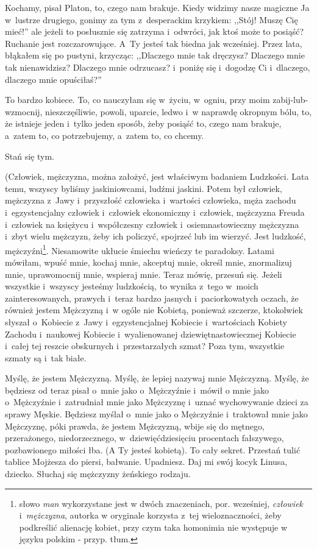\documentclass[oneside,polish,12pt,sfheadings]{mwbk}
\begin{document}
Kochamy, pisał Platon, to, czego nam brakuje. Kiedy widzimy nasze
magiczne Ja w~lustrze drugiego, gonimy za tym z~desperackim krzykiem:
,,Stój! Muszę Cię mieć!'' ale jeżeli to posłusznie się zatrzyma i~odwróci, jak ktoś może to posiąść? Ruchanie jest rozczarowujące. A~Ty jesteś tak biedna jak wcześniej. Przez lata, błąkałem się po pustyni,
krzycząc: ,,Dlaczego mnie tak dręczysz? Dlaczego mnie tak nienawidzisz?
Dlaczego mnie odrzucasz? i~poniżę się i~dogodzę Ci i~dlaczego, dlaczego
mnie opuściłaś?''

To bardzo kobiece. To, co nauczyłam się w~życiu, w~ogniu, przy moim
zabij-lub-wzmocnij, nieszczęśliwie, powoli, uparcie, ledwo i~w naprawdę
okropnym bólu, to, że istnieje jeden i~tylko jeden sposób, żeby
posiąść to, czego nam brakuje, a~zatem to, co potrzebujemy, a~zatem
to, co chcemy.

Stań się tym.

(Człowiek, mężczyzna, można założyć, jest właściwym badaniem Ludzkości.
Lata temu, wszyscy byliśmy jaskiniowcami, ludźmi jaskini. Potem był
człowiek, mężczyzna z~Jawy i~przyszłość człowieka i~wartości człowieka,
męża zachodu i~egzystencjalny człowiek i~człowiek ekonomiczny i~człowiek,
mężczyzna Freuda i~człowiek na księżycu i~współczesny człowiek i~osiemnastowieczny
mężczyzna i~zbyt wielu mężczyzn, żeby ich policzyć, spojrzeć lub im
wierzyć. Jest ludzkość, mężczyźni\footnote{słowo \textit{man} wykorzystane jest w dwóch znaczeniach, por. wcześniej, \textit{człowiek} i~\textit{mężczyzna}, autorka w oryginale korzysta z~tej wieloznaczności, żeby podkreślić
alienację kobiet, przy czym taka homonimia nie występuje w języku polskim - przyp. tłum.}. Niesamowite ukłucie śmiechu wieńczy te paradoksy.
Latami mówiłam, wpuść mnie, kochaj mnie, akceptuj mnie, określ mnie,
znormalizuj mnie, uprawomocnij mnie, wspieraj mnie. Teraz mówię, przesuń
się. Jeżeli wszystkie i~wszyscy jesteśmy ludzkością, to wynika z~tego
w~moich zainteresowanych, prawych i~teraz bardzo jasnych i~paciorkowatych
oczach, że również jestem Mężczyzną i~w ogóle nie Kobietą, ponieważ
szczerze, ktokolwiek słyszał o~Kobiecie z~Jawy i~egzystencjalnej Kobiecie
i~wartościach Kobiety Zachodu i~naukowej Kobiecie i~wyalienowanej
dziewiętnastowiecznej Kobiecie i~całej tej reszcie obskurnych i~przestarzałych
szmat? Poza tym, wszystkie szmaty są i~tak białe.

Myślę, że jestem Mężczyzną. Myślę, że lepiej nazywaj mnie Mężczyzną.
Myślę, że będziesz od teraz pisał o~mnie jako o~Mężczyźnie i~mówił
o mnie jako o~Mężczyźnie i~zatrudniał mnie jako Mężczyznę i~uznać
wychowywanie dzieci za sprawy Męskie. Będziesz myślał o~mnie jako
o Mężczyźnie i~traktował mnie jako Mężczyznę, póki prawda, że jestem
Mężczyzną, wbije się do mętnego, przerażonego, niedorzecznego, w~dziewięćdziesięciu procentach fałszywego, pozbawionego miłości łba. (A Ty jesteś kobietą).
To cały sekret. Przestań tulić tablice Mojżesza do piersi, bałwanie.
Upadniesz. Daj mi swój kocyk Linusa, dziecko. Słuchaj się mężczyzny
żeńskiego rodzaju.
\end{document}
